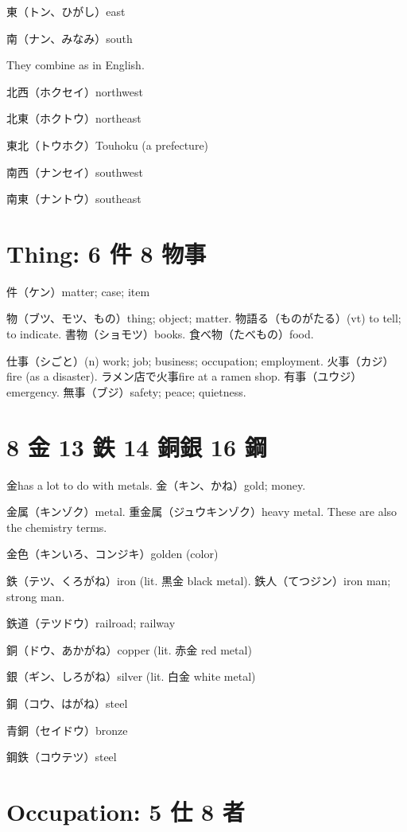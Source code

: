 東（トン、ひがし）east

南（ナン、みなみ）south

They combine as in English.

北西（ホクセイ）northwest

北東（ホクトウ）northeast

東北（トウホク）Touhoku (a prefecture)

南西（ナンセイ）southwest

南東（ナントウ）southeast

\section{Thing: 6 件 8 物事}

件（ケン）matter; case; item

物（ブツ、モツ、もの）thing; object; matter.
物語る（ものがたる）(vt) to tell; to indicate.
書物（ショモツ）books.
食べ物（たべもの）food.

仕事（シごと）(n) work; job; business; occupation; employment.
火事（カジ）fire (as a disaster).
ラメン店で火事fire at a ramen shop.
有事（ユウジ）emergency.
無事（ブジ）safety; peace; quietness.

\section{8 金 13 鉄 14 銅銀 16 鋼}

金has a lot to do with metals.
金（キン、かね）gold; money.

金属（キンゾク）metal.
重金属（ジュウキンゾク）heavy metal.
These are also the chemistry terms.

金色（キンいろ、コンジキ）golden (color)

鉄（テツ、くろがね）iron (lit. 黒金 black metal).
鉄人（てつジン）iron man; strong man.

鉄道（テツドウ）railroad; railway

銅（ドウ、あかがね）copper (lit. 赤金 red metal)

銀（ギン、しろがね）silver (lit. 白金 white metal)

鋼（コウ、はがね）steel

青銅（セイドウ）bronze

鋼鉄（コウテツ）steel

\section{Occupation: 5 仕 8 者}

